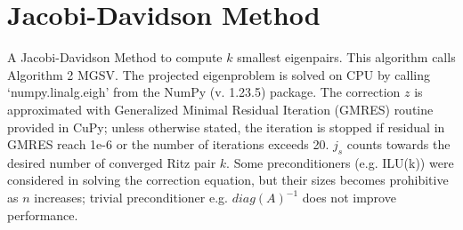 \documentclass[a4paper]{article}
\begin{document}
\pagebreak
\section{Jacobi-Davidson Method}

A Jacobi-Davidson Method to compute $k$ smallest eigenpairs. This algorithm calls Algorithm 2 MGSV. The projected eigenproblem is solved on CPU by calling ‘numpy.linalg.eigh’ from the NumPy (v. 1.23.5) package. The correction $z$ is approximated with Generalized Minimal Residual Iteration (GMRES) routine provided in CuPy; unless otherwise stated, the iteration is stopped if residual in GMRES reach 1e-6 or the number of iterations exceeds 20. $j_s$ counts towards the desired number of converged Ritz pair $k$. Some preconditioners (e.g. ILU(k)) were considered in solving the correction equation, but their sizes becomes prohibitive as $n$ increases; trivial preconditioner e.g. $diag(A)^{-1}$ does not improve performance.
\end{document}
